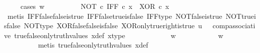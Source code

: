 \begin{isabellebody}
\ \ \ \ \isamarkupfalse%
{\isacharparenleft}{\kern0pt}cases\ {\isachardoublequoteopen}w\ {\isacharequal}{\kern0pt}\ {\isasymt}{\isachardoublequoteclose}{\isacharparenright}{\kern0pt}\isanewline
\ \ \ \ \ \ \isamarkupfalse%
\ {\isachardoublequoteopen}{\isacharparenleft}{\kern0pt}NOT\ {\isasymcirc}\isactrlsub c\ IFF{\isacharparenright}{\kern0pt}\ {\isasymcirc}\isactrlsub c\ x\ {\isacharequal}{\kern0pt}\ XOR\ {\isasymcirc}\isactrlsub c\ x{\isachardoublequoteclose}\isanewline
\ \ \ \ \ \ \ \ \isamarkupfalse%
\ {\isacharparenleft}{\kern0pt}metis\ IFF{\isacharunderscore}{\kern0pt}false{\isacharunderscore}{\kern0pt}false{\isacharunderscore}{\kern0pt}is{\isacharunderscore}{\kern0pt}true\ IFF{\isacharunderscore}{\kern0pt}false{\isacharunderscore}{\kern0pt}true{\isacharunderscore}{\kern0pt}is{\isacharunderscore}{\kern0pt}false\ IFF{\isacharunderscore}{\kern0pt}type\ NOT{\isacharunderscore}{\kern0pt}false{\isacharunderscore}{\kern0pt}is{\isacharunderscore}{\kern0pt}true\ NOT{\isacharunderscore}{\kern0pt}true{\isacharunderscore}{\kern0pt}is{\isacharunderscore}{\kern0pt}false\ NOT{\isacharunderscore}{\kern0pt}type\ XOR{\isacharunderscore}{\kern0pt}false{\isacharunderscore}{\kern0pt}false{\isacharunderscore}{\kern0pt}is{\isacharunderscore}{\kern0pt}false\ XOR{\isacharunderscore}{\kern0pt}only{\isacharunderscore}{\kern0pt}true{\isacharunderscore}{\kern0pt}right{\isacharunderscore}{\kern0pt}is{\isacharunderscore}{\kern0pt}true\ {\isacartoucheopen}u\ {\isacharequal}{\kern0pt}\ {\isasymf}{\isacartoucheclose}\ comp{\isacharunderscore}{\kern0pt}associative{}\ true{\isacharunderscore}{\kern0pt}false{\isacharunderscore}{\kern0pt}only{\isacharunderscore}{\kern0pt}truth{\isacharunderscore}{\kern0pt}values\ x{\isacharunderscore}{\kern0pt}def\ x{\isacharunderscore}{\kern0pt}type{\isacharparenright}{\kern0pt}\isanewline
\ \ \ \ \isamarkupfalse%
\isanewline
\ \ \ \ \ \ \isamarkupfalse%
\ {\isachardoublequoteopen}w\ {\isasymnoteq}\ {\isasymt}{\isachardoublequoteclose}\isanewline
\ \ \ \ \ \ \isamarkupfalse%
\ \isamarkupfalse%
\ {\isachardoublequoteopen}w\ {\isacharequal}{\kern0pt}\ {\isasymf}{\isachardoublequoteclose}\isanewline
\ \ \ \ \ \ \ \ \isamarkupfalse%
\ {\isacharparenleft}{\kern0pt}metis\ true{\isacharunderscore}{\kern0pt}false{\isacharunderscore}{\kern0pt}only{\isacharunderscore}{\kern0pt}truth{\isacharunderscore}{\kern0pt}values\ x{\isacharunderscore}{\kern0pt}def{\isacharparenright}{\kern0pt}\isanewline
\ \ \ \ \ \ \isamarkupfalse%

\end{isabellebody}
